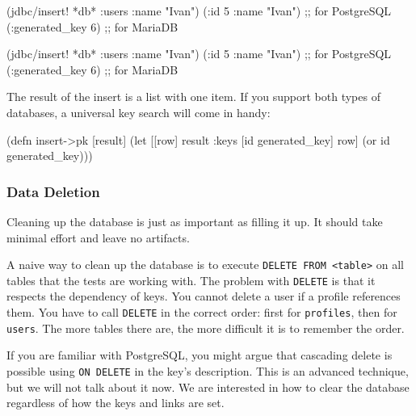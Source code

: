 \ifx\DEVICETYPE\MOBILE

\begin{english}
  \begin{clojure}
(jdbc/insert! *db*
  :users {:name "Ivan"})
({:id 5 :name "Ivan"}) ;; for PostgreSQL
({:generated_key 6})   ;; for MariaDB
  \end{clojure}
\end{english}

\else

\begin{english}
  \begin{clojure}
(jdbc/insert! *db* :users {:name "Ivan"})
({:id 5 :name "Ivan"}) ;; for PostgreSQL
({:generated_key 6})   ;; for MariaDB
  \end{clojure}
\end{english}

\fi

The result of the insert is a list with one item. If you support both types of databases, a universal key search will come in handy:

\begin{english}
  \begin{clojure}
(defn insert->pk [result]
  (let [[row] result
        {:keys [id generated_key]} row]
    (or id generated_key)))
  \end{clojure}
\end{english}

\subsubsection*{Data Deletion}


Cleaning up the database is just as important as filling it up. It should take minimal effort and leave no artifacts.

A naive way to clean up the database is to execute \verb|DELETE FROM <table>| on all tables that the tests are working with. The problem with \verb|DELETE| is that it respects the dependency of keys. You cannot delete a user if a profile references them. You have to call \verb|DELETE| in the correct order: first for \verb|profiles|, then for \verb|users|. The more tables there are, the more difficult it is to remember the order.


If you are familiar with PostgreSQL, you might argue that cascading delete is possible using \verb|ON DELETE| in the key's description. This is an advanced technique, but we will not talk about it now. We are interested in how to clear the database regardless of how the keys and links are set.

